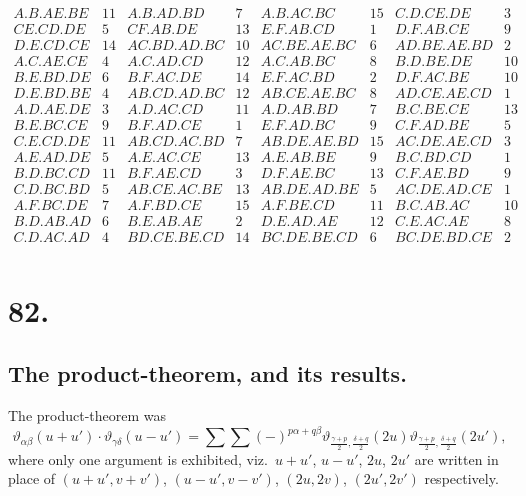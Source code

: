 \documentclass[11pt,a4paper]{article}
\newcommand{\uth}[1]{\vartheta_{#1}}
\begin{document}
\[
\begin{array}{llllllllllllll}
A.B.AE.BE & 11 & A.B.AD.BD & 7 & A.B.AC.BC & 15 & C.D.CE.DE & 3 \\
CE.CD.DE & 5 & CF.AB.DE & 13 & E.F.AB.CD & 1 & D.F.AB.CE & 9 \\
D.E.CD.CE & 14 & AC.BD.AD.BC & 10 & AC.BE.AE.BC & 6 & AD.BE.AE.BD & 2 \\
A.C.AE.CE & 4 & A.C.AD.CD & 12 & A.C.AB.BC & 8 & B.D.BE.DE & 10 \\
B.E.BD.DE & 6 & B.F.AC.DE & 14 & E.F.AC.BD & 2 & D.F.AC.BE & 10 \\
D.E.BD.BE & 4 & AB.CD.AD.BC & 12 & AB.CE.AE.BC & 8 & AD.CE.AE.CD & 1 \\
A.D.AE.DE & 3 & A.D.AC.CD & 11 & A.D.AB.BD & 7 & B.C.BE.CE & 13 \\
B.E.BC.CE & 9 & B.F.AD.CE & 1 & E.F.AD.BC & 9 & C.F.AD.BE & 5 \\
C.E.CD.DE & 11 & AB.CD.AC.BD & 7 & AB.DE.AE.BD & 15 & AC.DE.AE.CD & 3 \\
A.E.AD.DE & 5 & A.E.AC.CE & 13 & A.E.AB.BE & 9 & B.C.BD.CD & 1 \\
B.D.BC.CD & 11 & B.F.AE.CD & 3 & D.F.AE.BC & 13 & C.F.AE.BD & 9 \\
C.D.BC.BD & 5 & AB.CE.AC.BE & 13 & AB.DE.AD.BE & 5 & AC.DE.AD.CE & 1 \\
A.F.BC.DE & 7 & A.F.BD.CE & 15 & A.F.BE.CD & 11 & B.C.AB.AC & 10 \\
B.D.AB.AD & 6 & B.E.AB.AE & 2 & D.E.AD.AE & 12 & C.E.AC.AE & 8 \\
C.D.AC.AD & 4 & BD.CE.BE.CD & 14 & BC.DE.BE.CD & 6 & BC.DE.BD.CE & 2 \\
& & & & & & & & & & & & &
\end{array}
\]

\newpage
\section*{82.}
\label{sec:82}

\subsection*{The product-theorem, and its results.}

The product-theorem was
\[
\uth{\alpha\beta}(u+u') \cdot \uth{\gamma\delta}(u-u')
= \sum \sum (-)^{p\alpha + q\beta}
\uth{\frac{\gamma+p}{2}, \frac{\delta+q}{2}}(2u)
\uth{\frac{\gamma+p}{2}, \frac{\delta+q}{2}}(2u'),
\]
where only one argument is exhibited, viz.\ $u+u'$, $u-u'$, $2u$, $2u'$ are written in place of $(u+u', v+v')$, $(u-u', v-v')$, $(2u, 2v)$, $(2u', 2v')$ respectively.
\end{document}
